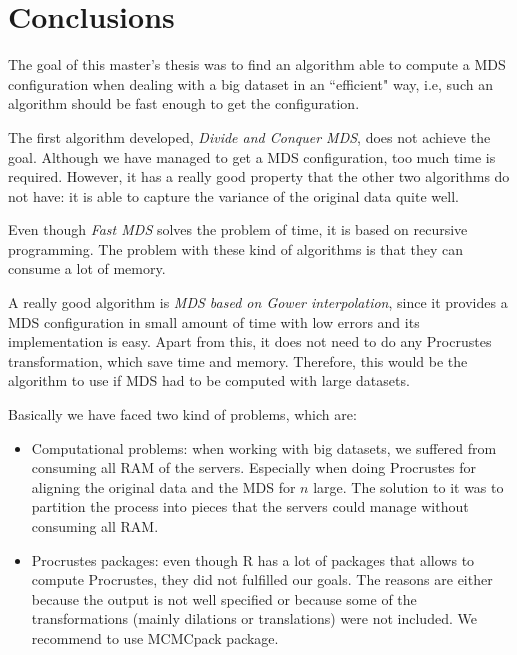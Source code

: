 \documentclass[11pt]{report}
\begin{document}
\chapter{Conclusions}
The goal of this master's thesis was to find an algorithm able to compute a MDS
configuration when dealing with a big dataset in an ``efficient" way, i.e, 
such an algorithm should be fast enough to get the configuration.

\indent The first algorithm developed, \textit{Divide and Conquer MDS}, does not 
achieve the goal. Although we have managed to get a MDS configuration, too much 
time is required. However, it has a really good property 
that the other two algorithms do not have: it is able to capture the variance
of the original data quite well. 

\indent Even though \textit{Fast MDS} solves the problem of time, it is based on 
recursive programming. The problem with these kind of algorithms is that they
can consume a lot of memory. 

\indent A really good algorithm is \textit{MDS based on Gower interpolation},
since it provides a MDS configuration in small amount of time with low errors 
and its implementation is easy. Apart from this, it does not need to do 
any Procrustes transformation, which save time and memory. Therefore, this 
would be the algorithm to use if MDS had to be computed with large datasets.\\



\indent Basically we have faced two kind of problems, which are:

\begin{itemize}
\item Computational problems: when working with big datasets, we suffered from
consuming all RAM of the servers. Especially when doing Procrustes for aligning
the original data and the MDS for $n$ large. The solution to it was to partition
the process into pieces that the servers could manage without consuming all RAM.

\item Procrustes packages: even though \textsf{R} has a lot of packages that
allows to compute Procrustes, they did not fulfilled our goals. The reasons are
either because the output is not well specified or because some of the 
transformations (mainly dilations or translations) were not included. We 
recommend to use \textsf{MCMCpack} package.

\end{itemize}
\end{document}
